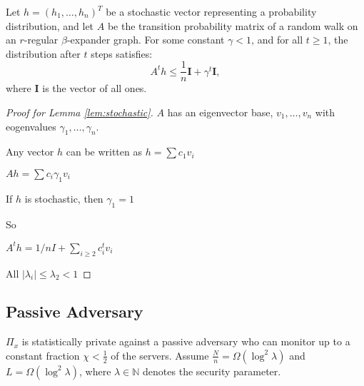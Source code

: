 \begin{lemma} \label{lem:stochastic}
Let $h = (h_1, \dots, h_n)^T$ be a stochastic vector representing a probability distribution, and let $A$ be the transition probability matrix of a random walk on an $r$-regular $\beta$-expander graph. For some constant $\gamma < 1$, and for all $t \geq 1$, the distribution after $t$ steps satisfies:
$$
A^t h \leq \frac{1}{n} \mathbf{I} + \gamma^t \mathbf{I},
$$
where $\mathbf{I}$ is the vector of all ones.
\end{lemma}
\begin{proof} [Proof for Lemma \ref{lem:stochastic}]

$A$ has an eigenvector base, $v_1,\dots,v_n$ with eogenvalues $\gamma_1,\dots, \gamma_n$.

Any vector $h$ can be written as
$h=\sum c_1 v_i$

$Ah= \sum c_i\gamma_1 v_i$

If $h$ is stochastic, then $\gamma_1=1$

So 

$A^t h= 1/nI + \sum_{i\geq 2} c_i^t v_i$

All $|\lambda_i| \leq \lambda_2< 1$


    
\end{proof}



\clearpage

\subsection{Passive Adversary}

\begin{theorem} \label{clm:passive}
    $\Pi_x$ is statistically private against a passive adversary who can monitor up to a constant fraction $\chi < \frac{1}{2}$ of the servers. Assume $\frac{N}{n} = \Omega(\log^2 \lambda)$ and $L = \Omega(\log^2 \lambda)$, where $\lambda \in \mathbb{N}$ denotes the security parameter.\\
\end{theorem}

